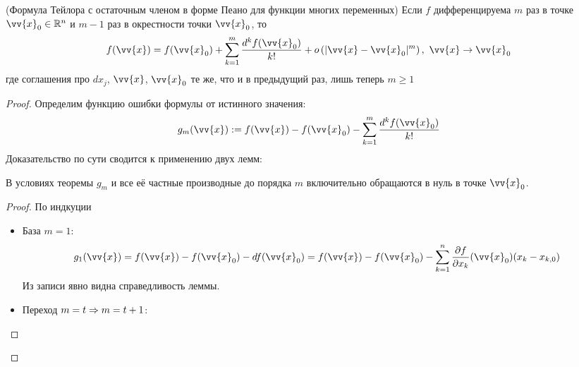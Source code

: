 \begin{theorem} (Формула Тейлора с остаточным членом в форме Пеано для функции многих переменных)
	Если $f$ дифференцируема $m$ раз в точке $\vv{x}_0 \in \R^n$ и $m - 1$ раз в окрестности точки $\vv{x}_0$, то
	\[
		f(\vv{x}) = f(\vv{x}_0) + \suml_{k = 1}^m \frac{d^k f(\vv{x}_0)}{k!} + o\left(|\vv{x} - \vv{x}_0|^m\right),\ \vv{x} \to \vv{x}_0
	\]
	где соглашения про $dx_j$, $\vv{x}$, $\vv{x}_0$ те же, что и в предыдущий раз, лишь теперь $m \geq 1$
\end{theorem}

\begin{proof}
	Определим функцию ошибки формулы от истинного значения:
	\[
		g_m(\vv{x}) := f(\vv{x}) - f(\vv{x}_0) - \suml_{k = 1}^m \frac{d^k f(\vv{x}_0)}{k!}
	\]
	Доказательство по сути сводится к применению двух лемм:
	\begin{lemma}
		В условиях теоремы $g_m$ и все её частные производные до порядка $m$ включительно обращаются в нуль в точке $\vv{x}_0$.
	\end{lemma}

	\begin{proof}
		По индкуции
		\begin{itemize}
			\item База $m = 1$:
			\[
				g_1(\vv{x}) = f(\vv{x}) - f(\vv{x}_0) - d f(\vv{x}_0) = f(\vv{x}) - f(\vv{x}_0) - \suml_{k = 1}^n \pd{f}{x_k} (\vv{x}_0) (x_k - x_{k, 0})
			\]
			Из записи явно видна справедливость леммы.
			
			\item Переход $m = t \Rightarrow m = t + 1$:
			

\end{itemize}
\end{proof}
\end{proof}

